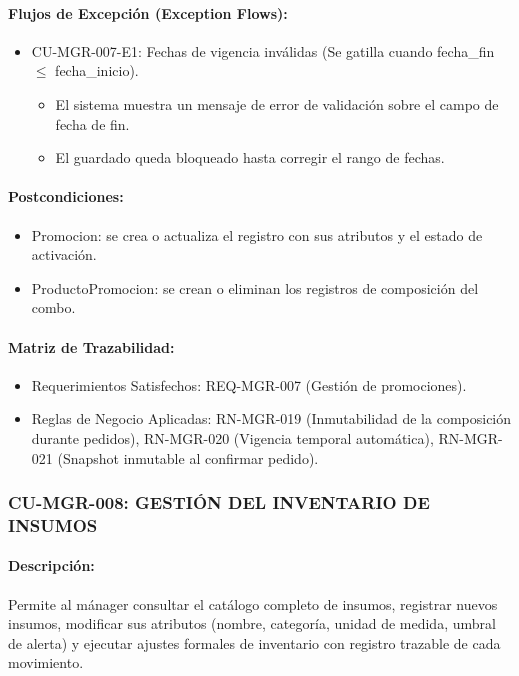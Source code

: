\paragraph{Flujos de Excepción (Exception Flows):}
\begin{itemize}
    \item CU-MGR-007-E1: Fechas de vigencia inválidas (Se gatilla cuando fecha\_fin $\le$ fecha\_inicio).
    \begin{itemize}
        \item El sistema muestra un mensaje de error de validación sobre el campo de fecha de fin.
        \item El guardado queda bloqueado hasta corregir el rango de fechas.
    \end{itemize}
\end{itemize}

\paragraph{Postcondiciones:}
\begin{itemize}
    \item Promocion: se crea o actualiza el registro con sus atributos y el estado de activación.
    \item ProductoPromocion: se crean o eliminan los registros de composición del combo.
\end{itemize}

\paragraph{Matriz de Trazabilidad:}
\begin{itemize}
    \item Requerimientos Satisfechos: REQ-MGR-007 (Gestión de promociones).
    \item Reglas de Negocio Aplicadas: RN-MGR-019 (Inmutabilidad de la composición durante pedidos), RN-MGR-020 (Vigencia temporal automática), RN-MGR-021 (Snapshot inmutable al confirmar pedido).
\end{itemize}

\subsubsection{CU-MGR-008: GESTIÓN DEL INVENTARIO DE INSUMOS}
\paragraph{Descripción:} Permite al mánager consultar el catálogo completo de insumos, registrar nuevos insumos, modificar sus atributos (nombre, categoría, unidad de medida, umbral de alerta) y ejecutar ajustes formales de inventario con registro trazable de cada movimiento.

